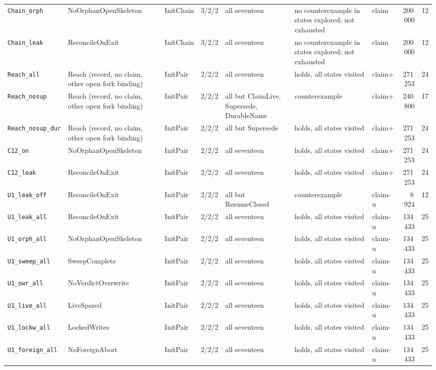 \documentclass[a4paper,10pt,fleqn]{article}
\begin{document}
{\begin{center}
\begin{tabularx}{\textwidth}{@{}l l l l X X l r r@{}}
\texttt{Chain\_orph} & NoOrphanOpenSkeleton & InitChain & 3/2/2 & all seventeen & no counterexample in states explored; not exhausted & claim & 200\,000 & 12 \\
\texttt{Chain\_leak} & ReconcileOnExit & InitChain & 3/2/2 & all seventeen & no counterexample in states explored; not exhausted & claim & 200\,000 & 12 \\
\texttt{Reach\_all} & Reach (record, no claim, other open fork binding) & InitPair & 2/2/2 & all seventeen & holds, all states visited & claim+ & 271\,253 & 24 \\
\texttt{Reach\_nosup} & Reach (record, no claim, other open fork binding) & InitPair & 2/2/2 & all but ClaimLive, Supersede, DurableName & counterexample & claim+ & 240\,800 & 17 \\
\texttt{Reach\_nosup\_dur} & Reach (record, no claim, other open fork binding) & InitPair & 2/2/2 & all but Supersede & holds, all states visited & claim+ & 271\,253 & 24 \\
\texttt{C12\_on} & NoOrphanOpenSkeleton & InitPair & 2/2/2 & all seventeen & holds, all states visited & claim+ & 271\,253 & 24 \\
\texttt{C12\_leak} & ReconcileOnExit & InitPair & 2/2/2 & all seventeen & holds, all states visited & claim+ & 271\,253 & 24 \\
\texttt{U1\_leak\_off} & ReconcileOnExit & InitPair & 2/2/2 & all but ResumeClosed & counterexample & claim-u & 8\,924 & 12 \\
\texttt{U1\_leak\_all} & ReconcileOnExit & InitPair & 2/2/2 & all seventeen & holds, all states visited & claim-u & 134\,433 & 25 \\
\texttt{U1\_orph\_all} & NoOrphanOpenSkeleton & InitPair & 2/2/2 & all seventeen & holds, all states visited & claim-u & 134\,433 & 25 \\
\texttt{U1\_sweep\_all} & SweepComplete & InitPair & 2/2/2 & all seventeen & holds, all states visited & claim-u & 134\,433 & 25 \\
\texttt{U1\_owr\_all} & NoVerdictOverwrite & InitPair & 2/2/2 & all seventeen & holds, all states visited & claim-u & 134\,433 & 25 \\
\texttt{U1\_live\_all} & LiveSpared & InitPair & 2/2/2 & all seventeen & holds, all states visited & claim-u & 134\,433 & 25 \\
\texttt{U1\_lockw\_all} & LockedWrites & InitPair & 2/2/2 & all seventeen & holds, all states visited & claim-u & 134\,433 & 25 \\
\texttt{U1\_foreign\_all} & NoForeignAbort & InitPair & 2/2/2 & all seventeen & holds, all states visited & claim-u & 134\,433 & 25 \\

\end{tabularx}
\end{center}}
\end{document}
